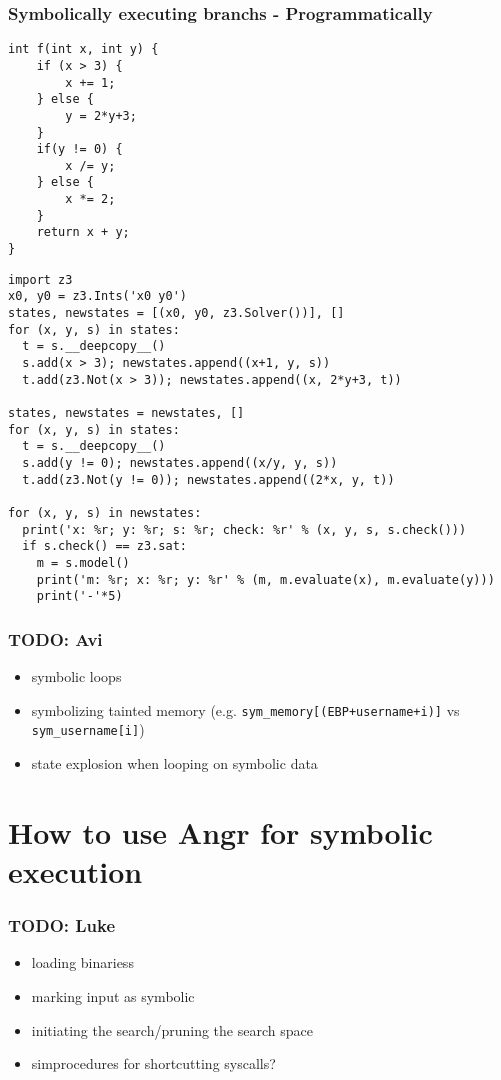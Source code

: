 \documentclass[aspectratio=169]{beamer}
\begin{document}
\begin{frame}[fragile]
\frametitle{Symbolically executing branchs - Programmatically}
\begin{minipage}{0.25\textwidth}
\begin{Verbatim}[fontsize=\scriptsize, frame=single]
int f(int x, int y) {
    if (x > 3) {
        x += 1;
    } else {
        y = 2*y+3;
    }
    if(y != 0) {
        x /= y;
    } else {
        x *= 2;
    }
    return x + y;
}
\end{Verbatim}
\end{minipage}
\begin{minipage}{0.74\textwidth}
\begin{Verbatim}[fontsize=\scriptsize, frame=single]
import z3
x0, y0 = z3.Ints('x0 y0')
states, newstates = [(x0, y0, z3.Solver())], []
for (x, y, s) in states:
  t = s.__deepcopy__()
  s.add(x > 3); newstates.append((x+1, y, s))
  t.add(z3.Not(x > 3)); newstates.append((x, 2*y+3, t))

states, newstates = newstates, []
for (x, y, s) in states:
  t = s.__deepcopy__()
  s.add(y != 0); newstates.append((x/y, y, s))
  t.add(z3.Not(y != 0)); newstates.append((2*x, y, t))

for (x, y, s) in newstates:
  print('x: %r; y: %r; s: %r; check: %r' % (x, y, s, s.check()))
  if s.check() == z3.sat:
    m = s.model()
    print('m: %r; x: %r; y: %r' % (m, m.evaluate(x), m.evaluate(y)))
    print('-'*5)
\end{Verbatim}
\end{minipage}
\end{frame}

\begin{frame}[fragile]
\frametitle{TODO: Avi}
\begin{itemize}
\item symbolic loops
\item symbolizing tainted memory (e.g. \verb|sym_memory[(EBP+username+i)]| vs \verb|sym_username[i]|)
\item state explosion when looping on symbolic data
\end{itemize}
\end{frame}

\section{How to use Angr for symbolic execution}
\begin{frame}[fragile]
\frametitle{TODO: Luke}
\begin{itemize}
\item loading binariess
\item marking input as symbolic
\item initiating the search/pruning the search space
\item simprocedures for shortcutting syscalls?
\end{itemize}
\end{frame}
\end{document}

